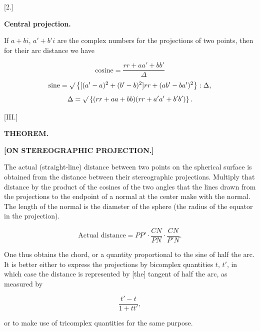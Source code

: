 
\begin{center}
[2.]
\end{center}

\begin{center}
\bfseries Central projection.
\end{center}

If $a+bi$, $a'+b'i$ are the complex numbers for the projections of two points, then for their arc distance we have

\[
\text{cosine} = \frac{rr+aa'+bb'}{\Delta}
\]
\[
\text{sine} = \mathord{\surd}\left\{[(a'-a)^2+(b'-b)^2]rr+(ab'-ba')^2\right\}:\Delta,
\]
\[
\Delta = \mathord{\surd}\left\{(rr+aa+bb)(rr+a'a'+b'b')\right\}.
\]

\begin{center}
[III.]
\end{center}

\begin{center}
\bfseries THEOREM.
\end{center}

\begin{center}
\bfseries [ON STEREOGRAPHIC PROJECTION.]
\end{center}

The actual (straight-line) distance between two points on the spherical surface is obtained from the distance between their stereographic projections. Multiply that distance by the product of the cosines of the two angles that the lines drawn from the projections to the endpoint of a normal at the center make with the normal. The length of the normal is the diameter of the sphere (the radius of the equator in the projection).

\[
\text{Actual distance} = PP'\cdot\frac{CN}{PN}\cdot\frac{CN}{P'N}.
\]

\begin{center}\end{center}
\indent One thus obtains the chord, or a quantity proportional to the sine of half the arc. It is better either to express the projections by bicomplex quantities $t$, $t'$, in which case the distance is represented by [the] tangent of half the arc, as measured by

\[
\frac{t'-t}{1+tt'},
\]

\noindent or to make use of tricomplex quantities for the same purpose.


